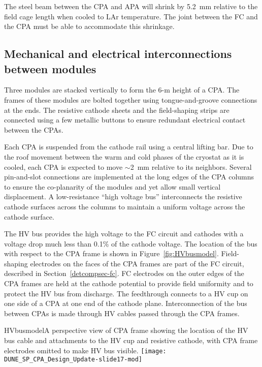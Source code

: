 The steel beam between the CPA and APA will shrink by 5.2~mm relative to the field cage length when cooled to LAr temperature.  The joint between the FC and the CPA must be able to accommodate this shrinkage.



\subsection{Mechanical and electrical interconnections between modules}

Three modules are stacked vertically to form the 6-m height of a CPA. %
The frames of these modules are bolted together using tongue-and-groove connections at the ends. The resistive cathode sheets and the field-shaping strips are connected using a few metallic buttons to ensure redundant electrical contact between the CPAs. %

Each CPA is suspended from the cathode rail using a central lifting bar.  Due to the roof movement between the warm and cold phases of the cryostat as it is cooled, each CPA is expected to move $\sim$2~mm relative to its neighbors.  Several pin-and-slot connections are implemented at the long edges of the CPA columns to ensure the co-planarity of the modules and yet allow small vertical displacement.  A low-resistance
``high voltage bus''  interconnects the resistive cathode surfaces across the columns to maintain a uniform voltage across the cathode surface.

The HV bus provides the high voltage to the FC
circuit and cathodes with a voltage drop much less than 0.1\% of the
cathode voltage. The location of the bus with respect to the CPA frame is shown in Figure~\ref{fig:HVbusmodel}. Field-shaping electrodes on the faces of the CPA
frames  are part of the FC circuit, described in Section~\ref{detcompsec-fc}. 
FC electrodes on the outer edges of the
CPA frames  are held at the cathode potential to provide field
uniformity and to protect the HV bus from discharge.  The feedthrough
connects to a HV cup on one side of a CPA at one end of
the cathode plane.  Interconnection of the bus between CPAs is made
through HV cables passed through the CPA frames. 

\begin{cdrfigure}{HVbusmodel}{A perspective view of CPA frame showing the location of the HV bus cable and attachments to the HV cup and resistive cathode, with CPA frame electrodes omitted to make HV bus visible.}
\texttt{[image: DUNE\_SP\_CPA\_Design\_Update-slide17-mod]}
\end{cdrfigure}


